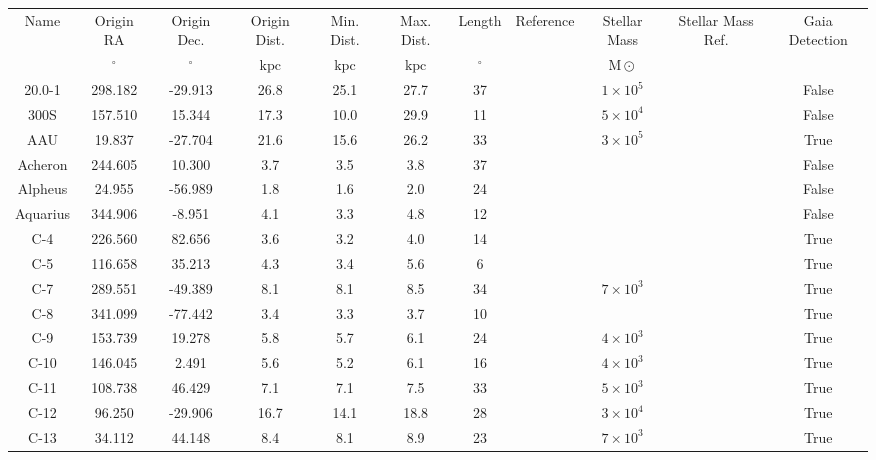 \begin{table}
\begin{tabular}{ccccccccccc}
\hline \hline
Name & Origin RA & Origin Dec. & Origin Dist. & Min. Dist. & Max. Dist. & Length & Reference & Stellar Mass & Stellar Mass Ref. & Gaia Detection \\
 & $\mathrm{{}^{\circ}}$ & $\mathrm{{}^{\circ}}$ & $\mathrm{kpc}$ & $\mathrm{kpc}$ & $\mathrm{kpc}$ & $\mathrm{{}^{\circ}}$ &  & $\mathrm{M{\odot}}$ &  &  \\
\hline
20.0-1 & 298.182 & -29.913 & 26.8 & 25.1 & 27.7 & 37 & \citet{mateu:2018} & $1 \times 10^{5}$ & \citet{mateu:2018} & False \\
300S & 157.510 & 15.344 & 17.3 & 10.0 & 29.9 & 11 & \citet{fu:2018} & $5 \times 10^{4}$ & \citet{usman:2024} & False \\
AAU & 19.837 & -27.704 & 21.6 & 15.6 & 26.2 & 33 & \citet{li:2021} & $3 \times 10^{5}$ & \citet{shipp:2018} & True \\
Acheron & 244.605 & 10.300 & 3.7 & 3.5 & 3.8 & 37 & \citet{grillmair:2009} & &  & False \\
Alpheus & 24.955 & -56.989 & 1.8 & 1.6 & 2.0 & 24 & \citet{grillmair:2013} & &  & False \\
Aquarius & 344.906 & -8.951 & 4.1 & 3.3 & 4.8 & 12 & \citet{williams:2011} & &  & False \\
C-4 & 226.560 & 82.656 & 3.6 & 3.2 & 4.0 & 14 & \citet{ibata:2021} & &  & True \\
C-5 & 116.658 & 35.213 & 4.3 & 3.4 & 5.6 & 6 & \citet{ibata:2021} & &  & True \\
C-7 & 289.551 & -49.389 & 8.1 & 8.1 & 8.5 & 34 & \citet{ibata:2023} & $7 \times 10^{3}$ &  & True \\
C-8 & 341.099 & -77.442 & 3.4 & 3.3 & 3.7 & 10 & \citet{ibata:2021} & &  & True \\
C-9 & 153.739 & 19.278 & 5.8 & 5.7 & 6.1 & 24 & \citet{ibata:2023} & $4 \times 10^{3}$ &  & True \\
C-10 & 146.045 & 2.491 & 5.6 & 5.2 & 6.1 & 16 & \citet{ibata:2023} & $4 \times 10^{3}$ &  & True \\
C-11 & 108.738 & 46.429 & 7.1 & 7.1 & 7.5 & 33 & \citet{ibata:2023} & $5 \times 10^{3}$ &  & True \\
C-12 & 96.250 & -29.906 & 16.7 & 14.1 & 18.8 & 28 & \citet{ibata:2023} & $3 \times 10^{4}$ &  & True \\
C-13 & 34.112 & 44.148 & 8.4 & 8.1 & 8.9 & 23 & \citet{ibata:2023} & $7 \times 10^{3}$ &  & True \\

\end{tabular}
\end{table}
